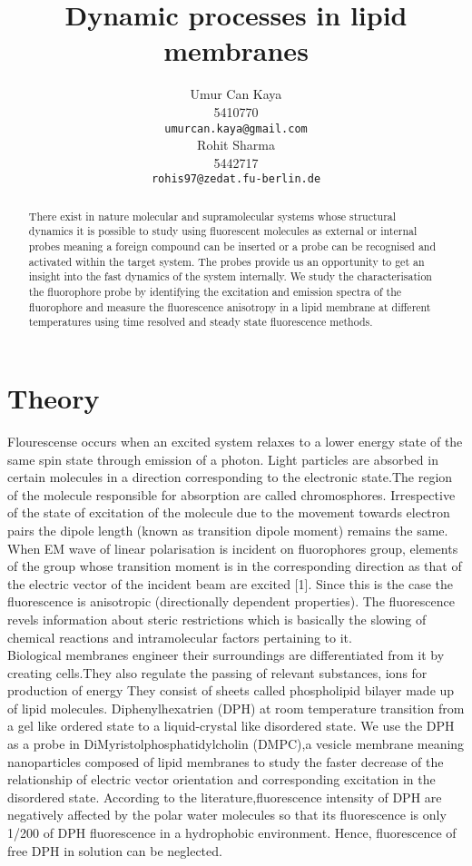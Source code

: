 \documentclass{article}
\title{Dynamic processes in lipid membranes}
\author{
Umur Can Kaya\\
5410770\\
\texttt{umurcan.kaya@gmail.com}\\
\And
Rohit Sharma\\
5442717\\
\texttt{rohis97@zedat.fu-berlin.de}\\
}
\begin{document}
\maketitle

\begin{abstract}
There exist in nature molecular and supramolecular systems whose structural dynamics it is possible to study using fluorescent molecules as external or internal probes meaning a foreign compound can be inserted or a probe can be recognised and activated within the target system. The probes provide us an opportunity to get an insight into the fast dynamics of the system internally. We study the characterisation  the  fluorophore  probe  by  identifying  the  excitation and  emission  spectra  of  the 
fluorophore and measure the fluorescence anisotropy in a lipid membrane at different temperatures using time resolved and steady state fluorescence methods.
\end{abstract}

\section{Theory}
Flourescense occurs when an excited system relaxes to a lower energy state of the same spin state through emission of a photon. Light particles are absorbed in certain molecules in a direction corresponding to the electronic state.The region of the molecule responsible for absorption are called chromosphores. Irrespective of the state of excitation of the molecule due to the movement towards electron pairs the dipole length (known as transition dipole moment) remains the same. When EM wave of linear polarisation is incident on  fluorophores group, elements of the group whose transition moment is in the corresponding direction as that of the electric vector of the incident beam are excited [1]. Since this is the case the  fluorescence is anisotropic (directionally dependent properties). The fluorescence revels information about steric restrictions which is basically the slowing of chemical reactions and intramolecular factors pertaining to it. \\

Biological membranes engineer their surroundings are differentiated from it by creating cells.They also regulate the passing of relevant substances, ions for production of energy  They consist of sheets called phospholipid bilayer made up of lipid molecules. Diphenylhexatrien (DPH) at room temperature transition from a gel like ordered state to a liquid-crystal like disordered state. We use the DPH as a probe in DiMyristolphosphatidylcholin (DMPC),a vesicle membrane meaning nanoparticles composed of lipid membranes to study the faster decrease of the relationship of electric vector orientation and corresponding excitation in the disordered state. According to the literature,fluorescence intensity of DPH are negatively affected by the polar water molecules so that its fluorescence is 
only  ~  1/200  of  DPH  fluorescence  in  a  hydrophobic  environment.  Hence,  fluorescence  of  free  DPH  in 
solution can be neglected.
\end{document}
